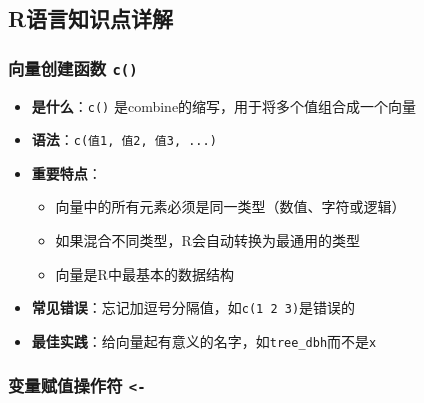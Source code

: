 \documentclass[
]{book}
\providecommand{\tightlist}{%
  \setlength{\itemsep}{0pt}\setlength{\parskip}{0pt}}
\begin{document}
\hypertarget{rux8bedux8a00ux77e5ux8bc6ux70b9ux8be6ux89e3}{%
\subsection{R语言知识点详解}\label{rux8bedux8a00ux77e5ux8bc6ux70b9ux8be6ux89e3}}

\hypertarget{ux5411ux91cfux521bux5efaux51fdux6570-c}{%
\subsubsection{\texorpdfstring{向量创建函数 \texttt{c()}}{向量创建函数 c()}}\label{ux5411ux91cfux521bux5efaux51fdux6570-c}}

\begin{itemize}
\tightlist
\item
  \textbf{是什么}：\texttt{c()} 是combine的缩写，用于将多个值组合成一个向量
\item
  \textbf{语法}：\texttt{c(值1,\ 值2,\ 值3,\ ...)}
\item
  \textbf{重要特点}：

  \begin{itemize}
  \tightlist
  \item
    向量中的所有元素必须是同一类型（数值、字符或逻辑）
  \item
    如果混合不同类型，R会自动转换为最通用的类型
  \item
    向量是R中最基本的数据结构
  \end{itemize}
\item
  \textbf{常见错误}：忘记加逗号分隔值，如\texttt{c(1\ 2\ 3)}是错误的
\item
  \textbf{最佳实践}：给向量起有意义的名字，如\texttt{tree\_dbh}而不是\texttt{x}
\end{itemize}

\hypertarget{ux53d8ux91cfux8d4bux503cux64cdux4f5cux7b26--}{%
\subsubsection{\texorpdfstring{变量赋值操作符 \texttt{\textless{}-}}{变量赋值操作符 \textless-}}\label{ux53d8ux91cfux8d4bux503cux64cdux4f5cux7b26--}}
\end{document}
